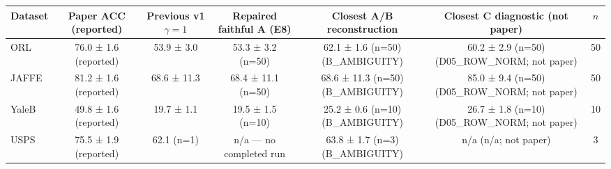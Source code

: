 \begin{tabular}{lcccccc}
\hline
Dataset & Paper ACC (reported) & Previous v1 $\gamma{=}1$ & Repaired faithful A (E8) & Closest A/B reconstruction & Closest C diagnostic (not paper) & $n$ \\
\hline
ORL & 76.0 ± 1.6 (reported) & 53.9 ± 3.0 & 53.3 ± 3.2 (n=50) & 62.1 ± 1.6 (n=50) (B_AMBIGUITY) & 60.2 ± 2.9 (n=50) (D05_ROW_NORM; not paper) & 50 \\
JAFFE & 81.2 ± 1.6 (reported) & 68.6 ± 11.3 & 68.4 ± 11.1 (n=50) & 68.6 ± 11.3 (n=50) (B_AMBIGUITY) & 85.0 ± 9.4 (n=50) (D05_ROW_NORM; not paper) & 50 \\
YaleB & 49.8 ± 1.6 (reported) & 19.7 ± 1.1 & 19.5 ± 1.5 (n=10) & 25.2 ± 0.6 (n=10) (B_AMBIGUITY) & 26.7 ± 1.8 (n=10) (D05_ROW_NORM; not paper) & 10 \\
USPS & 75.5 ± 1.9 (reported) & 62.1 (n=1) & n/a — no completed run & 63.8 ± 1.7 (n=3) (B_AMBIGUITY) & n/a (n/a; not paper) & 3 \\
\hline
\end{tabular}
